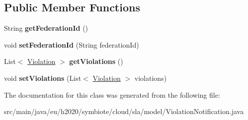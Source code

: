 \subsection*{Public Member Functions}
\begin{DoxyCompactItemize}
\item 
\mbox{\label{classeu_1_1h2020_1_1symbiote_1_1cloud_1_1sla_1_1model_1_1ViolationNotification_aa8fecf1a6966bb3f49b5c138f7ab40fa}} 
String {\bfseries get\+Federation\+Id} ()
\item 
\mbox{\label{classeu_1_1h2020_1_1symbiote_1_1cloud_1_1sla_1_1model_1_1ViolationNotification_a1bd23bd80513656c93d742f51d1e34cc}} 
void {\bfseries set\+Federation\+Id} (String federation\+Id)
\item 
\mbox{\label{classeu_1_1h2020_1_1symbiote_1_1cloud_1_1sla_1_1model_1_1ViolationNotification_a9e9416703bed5e84ed727c32c70a4abc}} 
List$<$ \hyperlink{classeu_1_1h2020_1_1symbiote_1_1cloud_1_1sla_1_1model_1_1Violation}{Violation} $>$ {\bfseries get\+Violations} ()
\item 
\mbox{\label{classeu_1_1h2020_1_1symbiote_1_1cloud_1_1sla_1_1model_1_1ViolationNotification_acae8856ede9bbfb10a0d112781116fc6}} 
void {\bfseries set\+Violations} (List$<$ \hyperlink{classeu_1_1h2020_1_1symbiote_1_1cloud_1_1sla_1_1model_1_1Violation}{Violation} $>$ violations)
\end{DoxyCompactItemize}


The documentation for this class was generated from the following file\+:\begin{DoxyCompactItemize}
\item 
src/main/java/eu/h2020/symbiote/cloud/sla/model/Violation\+Notification.\+java\end{DoxyCompactItemize}
